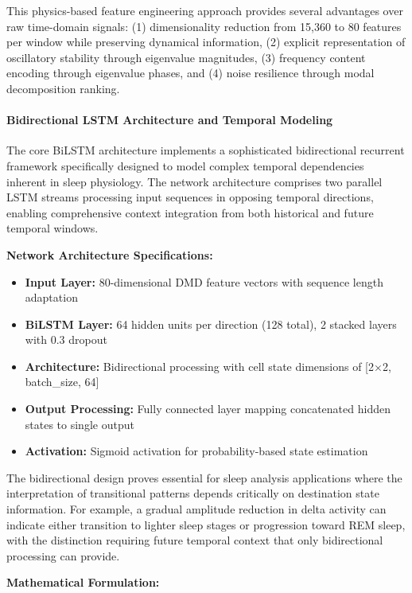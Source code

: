 \documentclass[a4paper,12pt,twoside]{article}
\begin{document}
This physics-based feature engineering approach provides several advantages over raw time-domain signals: (1) dimensionality reduction from 15,360 to 80 features per window while preserving dynamical information, (2) explicit representation of oscillatory stability through eigenvalue magnitudes, (3) frequency content encoding through eigenvalue phases, and (4) noise resilience through modal decomposition ranking.

\paragraph{Bidirectional LSTM Architecture and Temporal Modeling}

The core BiLSTM architecture implements a sophisticated bidirectional recurrent framework specifically designed to model complex temporal dependencies inherent in sleep physiology. The network architecture comprises two parallel LSTM streams processing input sequences in opposing temporal directions, enabling comprehensive context integration from both historical and future temporal windows.

\textbf{Network Architecture Specifications:}
\begin{itemize}
    \item \textbf{Input Layer:} 80-dimensional DMD feature vectors with sequence length adaptation
    \item \textbf{BiLSTM Layer:} 64 hidden units per direction (128 total), 2 stacked layers with 0.3 dropout
    \item \textbf{Architecture:} Bidirectional processing with cell state dimensions of [2×2, batch\_size, 64]
    \item \textbf{Output Processing:} Fully connected layer mapping concatenated hidden states to single output
    \item \textbf{Activation:} Sigmoid activation for probability-based state estimation
\end{itemize}

The bidirectional design proves essential for sleep analysis applications where the interpretation of transitional patterns depends critically on destination state information. For example, a gradual amplitude reduction in delta activity can indicate either transition to lighter sleep stages or progression toward REM sleep, with the distinction requiring future temporal context that only bidirectional processing can provide.

\textbf{Mathematical Formulation:}
\end{document}

